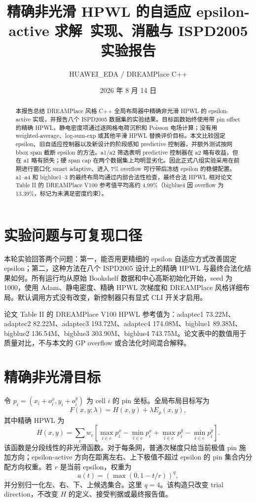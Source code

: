 \documentclass[11pt,a4paper]{ctexart}
\title{精确非光滑 HPWL 的自适应 epsilon-active 求解\ 实现、消融与 ISPD2005 实验报告}
\author{HUAWEI\_EDA / DREAMPlace C++}
\date{2026 年 8 月 14 日}
\begin{document}
\maketitle

\begin{abstract}
本报告总结 DREAMPlace 风格 C++ 全局布局器中精确非光滑 HPWL 的 epsilon-active 实现，并报告八个 ISPD2005 数据集的实验结果。目标函数始终使用带 pin offset 的精确 HPWL，静电密度项通过逐网格电荷沉积和 Poisson 电场计算；没有用 weighted-average、log-sum-exp 或其他平滑 HPWL 替换评价目标。本文比较固定 epsilon、旧自适应控制器以及新设计的阶段感知 predictive 控制器，并额外测试按网 bbox span 截断 epsilon 的方法。a1/a2 筛选表明 predictive 控制器在 a2 略有收益，但在 a1 略有损失；硬 span cap 在两个数据集上均明显劣化。因此正式八组实验采用在前期进行窗口化 smart adaptive、进入 7\% overflow 可行带后冻结 epsilon 的稳健配置。a1--a4 和 bigblue1--3 的最终布局均通过内部合法性检查，最终合法 HPWL 相对论文 Table II 的 DREAMPlace V100 参考值平均高约 4.99\%（bigblue4 因 overflow 为 13.39\%，标记为未满足密度约束）。
\end{abstract}

\section{实验问题与可复现口径}

本轮实验回答两个问题：第一，能否用更精细的 epsilon 自适应方式改善固定 epsilon；第二，这种方法在八个 ISPD2005 设计上的精确 HPWL 与最终合法化结果如何。所有运行均从原始 Bookshelf 数据和中心高斯初始化开始，seed 为 1000，使用 Adam、静电密度、精确 HPWL 次梯度和 DREAMPlace 风格详细布局。默认调用方式没有改变，新控制器只有显式 CLI 开关才启用。

论文 Table II 的 DREAMPlace V100 HPWL 参考值为：adaptec1 73.22M、adaptec2 82.22M、adaptec3 193.72M、adaptec4 174.08M、bigblue1 89.38M、bigblue2 136.54M、bigblue3 303.90M、bigblue4 743.75M。论文表中的数值用于质量对比，不与本文的 GP overflow 或合法化时间混合解释。

\section{精确非光滑目标}

令 $p_i=(x_i+o_i^x,y_i+o_i^y)$ 为 cell $i$ 的 pin 坐标。全局布局目标写为
\begin{equation}
 F(x,y;\lambda)=H(x,y)+\lambda E_\rho(x,y),
\end{equation}
其中精确 HPWL 为
\begin{equation}
 H(x,y)=\sum_{e} w_e\left[\max_{i\in e}p_i^x-\min_{i\in e}p_i^x
 +\max_{i\in e}p_i^y-\min_{i\in e}p_i^y\right].
\end{equation}
该函数是分段线性的非光滑函数。对于每条网，普通次梯度只给当前极值 pin 施加方向；epsilon-active 方向在距离左右、上下极值不超过 epsilon 的 pin 集合内分配方向权重。若 $r$ 是当前 epsilon，权重为
\begin{equation}
 a(t)=\left(\max(0,1-t/r)\right)^q,
\end{equation}
并分别归一化左、右、下、上候选集合。这里 $q=4$。该构造只改变 trial direction，不改变 $H$ 的定义、接受判据或最终报告值。
\end{document}
